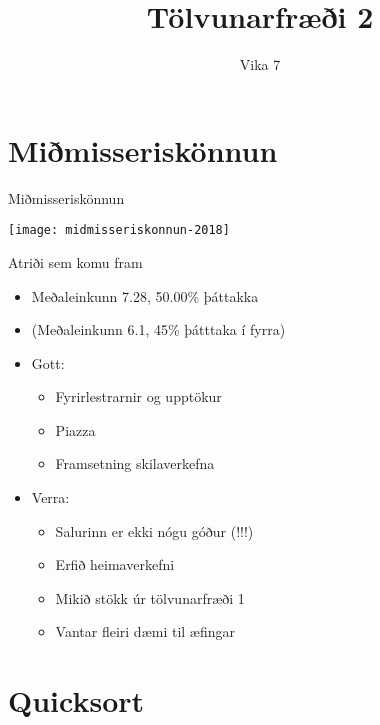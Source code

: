 \documentclass[handout]{beamer}
\title{Tölvunarfræði 2}
\subtitle{Vika 7}
\begin{document}
\begin{frame}
	\titlepage
\end{frame}

\section{Miðmisseriskönnun}

\begin{frame}{Miðmisseriskönnun}
	\begin{center}
		\texttt{[image: midmisseriskonnun-2018]}
	\end{center}
\end{frame}

\begin{frame}{Atriði sem komu fram}
	\begin{itemize}
		\item Meðaleinkunn 7.28, 50.00\% þáttakka
		\item (Meðaleinkunn 6.1, 45\% þátttaka í fyrra)
		\item Gott:
		      \begin{itemize}
			      \item Fyrirlestrarnir og upptökur
			      \item Piazza
			      \item Framsetning skilaverkefna
		      \end{itemize}
		\item Verra:
		      \begin{itemize}
			      \item Salurinn er ekki nógu góður (!!!)
			      \item Erfið heimaverkefni
			      \item Mikið stökk úr tölvunarfræði 1
			      \item Vantar fleiri dæmi til æfingar
		      \end{itemize}
	\end{itemize}
\end{frame}

\section{Quicksort}
\end{document}

